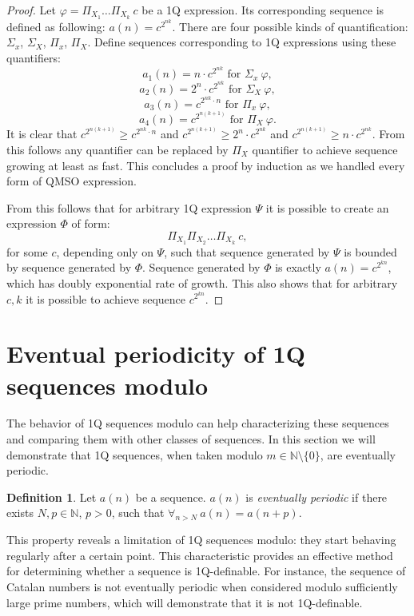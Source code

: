 \documentclass[12pt]{article}
\theoremstyle{definition}
\newtheorem{definition}{Definition}[section]
\begin{document}
\begin{proof}
    Let $\varphi = \Pi_{X_1}\ldots \Pi_{X_k} \ c$ be a 1Q expression. Its corresponding sequence is defined as following: $a(n) = c^{2^{nk}}$. There are four possible kinds of quantification: $\Sigma_x$, $\Sigma_X$, $\Pi_x$, $\Pi_X$. Define sequences corresponding to 1Q expressions using these quantifiers:
    $$a_1(n) = n \cdot c^{2^{nk}} \text{ for } \Sigma_x \ \varphi,$$
    $$a_2(n) = 2^n \cdot c^{2^{nk}} \text{ for } \Sigma_X \ \varphi,$$
    $$a_3(n) = c^{2^{nk} \cdot n} \text{ for } \Pi_x \ \varphi,$$
    $$a_4(n) = c^{2^{n(k+1)}} \text{ for } \Pi_X \ \varphi.$$
    It is clear that $c^{2^{n(k+1)}} \geq c^{2^{nk} \cdot n}$ and $c^{2^{n(k+1)}} \geq 2^n \cdot c^{2^{nk}}$ and $c^{2^{n(k+1)}} \geq n \cdot c^{2^{nk}}$. From this follows any quantifier can be replaced by $\Pi_X$ quantifier to achieve sequence growing at least as fast. This concludes a proof by induction as we handled every form of QMSO expression.

    From this follows that for arbitrary 1Q expression $\varPsi$ it is possible to create an expression $\varPhi$ of form:
    $$\Pi_{X_1}\Pi_{X_2}\ldots \Pi_{X_k} \ c,$$
    for some $c$, depending only on $\varPsi$, such that sequence generated by $\varPsi$ is bounded by sequence generated by $\varPhi$. Sequence generated by $\varPhi$ is exactly $a(n) = c^{2^{kn}}$, which has doubly exponential rate of growth. This also shows that for arbitrary $c, k$ it is possible to achieve sequence $c^{2^{kn}}$.
\end{proof}

\section{Eventual periodicity of 1Q sequences modulo}
\label{Sec1QFiniteSemirings}
The behavior of 1Q sequences modulo can help characterizing these sequences and comparing them with other classes of sequences. In this section we will demonstrate that 1Q sequences, when taken modulo $m \in \mathbb{N} \setminus \{0\}$, are eventually periodic.

\begin{definition}
    Let $a(n)$ be a sequence. $a(n)$ is \textit{eventually periodic} if there exists $N, p \in \mathbb{N}$, $p > 0$, such that $\forall_{n > N} \ a(n) = a(n+p)$.
\end{definition}

This property reveals a limitation of 1Q sequences modulo: they start behaving regularly after a certain point. This characteristic provides an effective method for determining whether a sequence is 1Q-definable. For instance, the sequence of Catalan numbers is not eventually periodic when considered modulo sufficiently large prime numbers, which will demonstrate that it is not 1Q-definable.
\end{document}
